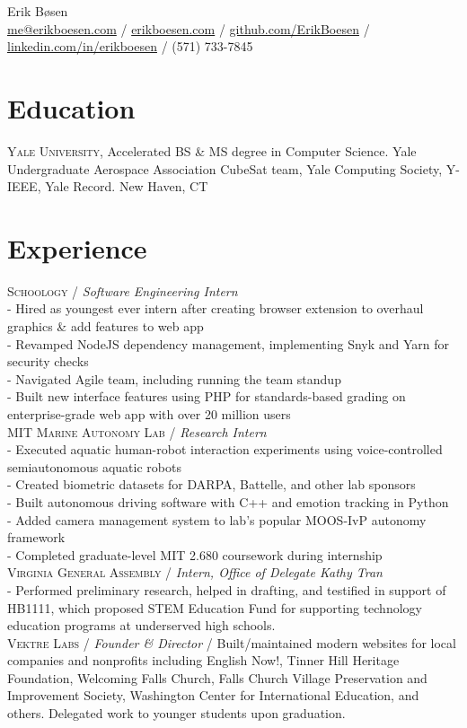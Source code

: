 \documentclass[10pt, a4paper]{article}
\newcommand{\years}[1]{\marginnote{\scriptsize #1}}
\begin{document}
{\LARGE Erik Bøsen}\\
\href{mailto:me@erikboesen.com}{me@erikboesen.com} / \href{https://erikboesen.com}{erikboesen.com} / \href{https://github.com/ErikBoesen}{github.com/ErikBoesen} / \href{https://www.linkedin.com/in/erikboesen}{linkedin.com/in/erikboesen} / (571) 733-7845\\

\section*{Education}
\noindent
\years{2019-2023}\textsc{Yale University}, Accelerated BS \& MS degree in Computer Science. Yale Undergraduate Aerospace Association CubeSat team, Yale Computing Society, Y-IEEE, Yale Record. New Haven, CT\\

\section*{Experience}
\years{2019}\textsc{Schoology} / \textit{Software Engineering Intern}\\
- Hired as youngest ever intern after creating browser extension to overhaul graphics \& add features to web app\\
- Revamped NodeJS dependency management, implementing Snyk and Yarn for security checks\\
- Navigated Agile team, including running the team standup\\
- Built new interface features using PHP for standards-based grading on enterprise-grade web app with over 20 million users\\
\years{2018}\textsc{MIT Marine Autonomy Lab} / \textit{Research Intern}\\
- Executed aquatic human-robot interaction experiments using voice-controlled semiautonomous aquatic robots\\
- Created biometric datasets for DARPA, Battelle, and other lab sponsors\\
- Built autonomous driving software with C++ and emotion tracking in Python \\
- Added camera management system to lab's popular MOOS-IvP autonomy framework\\
- Completed graduate-level MIT 2.680 coursework during internship\\
\years{2018}\textsc{Virginia General Assembly} / \textit{Intern, Office of Delegate Kathy Tran}\\
- Performed preliminary research, helped in drafting, and testified in support of HB1111, which proposed STEM Education Fund for supporting technology education programs at underserved high schools.\\
\years{2016-2019}\textsc{Vektre Labs} / \textit{Founder \& Director} / Built/maintained modern websites for local companies and nonprofits including English Now!, Tinner Hill Heritage Foundation, Welcoming Falls Church, Falls Church Village Preservation and Improvement Society, Washington Center for International Education, and others. Delegated work to younger students upon graduation.\\
\end{document}

